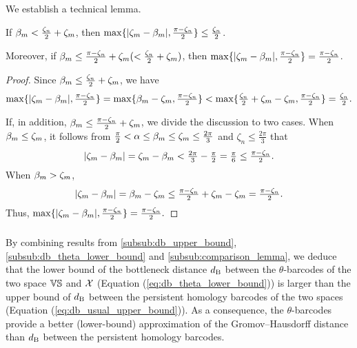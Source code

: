 We establish a technical lemma.

\medskip\lemma
If $\beta_m < \tfrac{\zeta_n}{2}+\zeta_m$, then
$\max\{|\zeta_m  - \beta_m |, \tfrac{\pi - \zeta_n}{2}\} \leq \tfrac{\zeta_n}{2}$.

Moreover, if $\beta_m \leq \tfrac{\pi - \zeta_n}{2} + \zeta_m (< \tfrac{\zeta_n}{2}+\zeta_m)$, then $\max\{|\zeta_m  - \beta_m |, \tfrac{\pi - \zeta_n}{2}\} = \tfrac{\pi - \zeta_n}{2}$.

\begin{proof}
    	Since $\beta_m \leq \tfrac{\zeta_n}{2} + \zeta_m$, we have
    	\[
    	\max\{|\zeta_m  - \beta_m |, \tfrac{\pi - \zeta_n}{2}\}
    	= \max\{\beta_m - \zeta_m, \tfrac{\pi - \zeta_n}{2}\}
    	< \max\{\tfrac{\zeta_n}{2}+\zeta_m - \zeta_m, \tfrac{\pi - \zeta_n}{2}\}
    	= \tfrac{\zeta_n}{2} .
    	\]
     
    	If, in addition, $\beta_m \leq \tfrac{\pi - \zeta_n}{2} + \zeta_m$, we divide the discussion to two cases.
    	When $\beta_m \leq \zeta_m$, it follows from $\tfrac{\pi}{2} < \alpha \leq \beta_m \leq \zeta_m  \leq \tfrac{2\pi}{3}$ and $\zeta_n \leq \tfrac{2\pi}{3}$ that
    	\[
    	|\zeta_m  - \beta_m |
    	= \zeta_m  - \beta_m
    	< \tfrac{2\pi}{3} - \tfrac{\pi}{2}
    	= \tfrac{\pi}{6}
    	\leq \tfrac{\pi - \zeta_n}{2}.
    	\]
    	When $\beta_m > \zeta_m$, 
    	\[
    	|\zeta_m  - \beta_m |
    	= \beta_m - \zeta_m
    	\leq \tfrac{\pi - \zeta_n}{2} + \zeta_m - \zeta_m
    	= \tfrac{\pi - \zeta_n}{2}.
    	\]
    	Thus, $\max\{|\zeta_m  - \beta_m |, \tfrac{\pi - \zeta_n}{2}\} = \tfrac{\pi - \zeta_n}{2}.$
\end{proof}

\subsubsection{}
By combining results from \cref{subsub:db_upper_bound}, \cref{subsub:db_theta_lower_bound} and \cref{subsub:comparison_lemma}, we deduce that the lower bound of the bottleneck distance $d_{\mathrm{B}}$ between the $\theta$-barcodes of the two space $\mathbb{V}\mathbb{S}$ and $\mathcal{X}$ (Equation (\ref{eq:db_theta_lower_bound})) is larger than the upper bound of $d_{\mathrm{B}}$ between the persistent homology barcodes of the two spaces (Equation (\ref{eq:db_usual_upper_bound})).
As a consequence, the $\theta$-barcodes provide a better (lower-bound) approximation of the Gromov--Hausdorff distance than $d_{\mathrm{B}}$ between the persistent homology barcodes.

